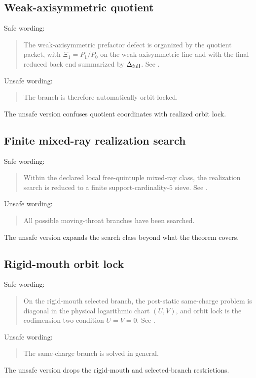 \subsection{Weak-axisymmetric quotient}
\label{subsec:citation-wording-quotient}

Safe wording:
\begin{quote}
The weak-axisymmetric prefactor defect is organized by the quotient packet, with \(\Xi_1=P_1/P_0\) on the weak-axisymmetric line and with the final reduced back end summarized by \(\Delta_{\rm full}\).  See .
\end{quote}

Unsafe wording:
\begin{quote}
The branch is therefore automatically orbit-locked.
\end{quote}
The unsafe version confuses quotient coordinates with realized orbit lock.

\subsection{Finite mixed-ray realization search}
\label{subsec:citation-wording-realization-search}

Safe wording:
\begin{quote}
Within the declared local free-quintuple mixed-ray class, the realization search is reduced to a finite support-cardinality-\(5\) sieve.  See .
\end{quote}

Unsafe wording:
\begin{quote}
All possible moving-throat branches have been searched.
\end{quote}
The unsafe version expands the search class beyond what the theorem covers.

\subsection{Rigid-mouth orbit lock}
\label{subsec:citation-wording-rigid-mouth}

Safe wording:
\begin{quote}
On the rigid-mouth selected branch, the post-static same-charge problem is diagonal in the physical logarithmic chart \((U,V)\), and orbit lock is the codimension-two condition \(U=V=0\).  See .
\end{quote}

Unsafe wording:
\begin{quote}
The same-charge branch is solved in general.
\end{quote}
The unsafe version drops the rigid-mouth and selected-branch restrictions.


